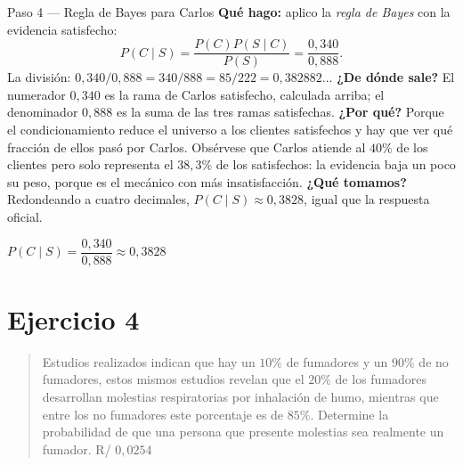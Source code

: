 \documentclass[11pt]{article}
\begin{document}
\begin{sol}
\begin{paso}{Paso 4 --- Regla de Bayes para Carlos}
\textbf{Qué hago:} aplico la \emph{regla de Bayes} con la evidencia satisfecho:
\[
P(C\mid S)=\frac{P(C)P(S\mid C)}{P(S)}=\frac{0,340}{0,888}.
\]
La división: $0,340/0,888=340/888=85/222=0,382882\ldots$
\textbf{¿De dónde sale?} El numerador $0,340$ es la rama de Carlos satisfecho, calculada arriba; el denominador $0,888$ es la suma de las tres ramas satisfechas.
\textbf{¿Por qué?} Porque el condicionamiento reduce el universo a los clientes satisfechos y hay que ver qué fracción de ellos pasó por Carlos. Obsérvese que Carlos atiende al $40\%$ de los clientes pero solo representa el $38,3\%$ de los satisfechos: la evidencia baja un poco su peso, porque es el mecánico con más insatisfacción.
\textbf{¿Qué tomamos?} Redondeando a cuatro decimales, $P(C\mid S)\approx 0,3828$, igual que la respuesta oficial.
\end{paso}

\begin{resp}
$P(C\mid S)=\dfrac{0,340}{0,888}\approx 0,3828$
\end{resp}

\end{sol}

\newpage
\section*{Ejercicio 4}

\begin{quote}
Estudios realizados indican que hay un $10\%$ de fumadores y un $90\%$ de no fumadores, estos mismos estudios revelan que el $20\%$ de los fumadores desarrollan molestias respiratorias por inhalación de humo, mientras que entre los no fumadores este porcentaje es de $85\%$. Determine la probabilidad de que una persona que presente molestias sea realmente un fumador. \hfill R/ $0,0254$
\end{quote}
\end{document}
